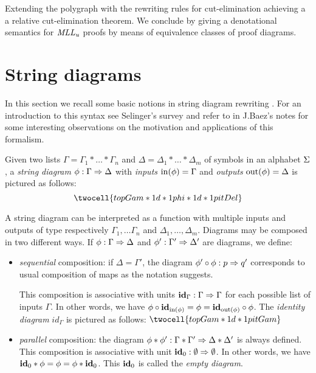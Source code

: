 \documentclass[a4paper]{article}
\begin{document}
Extending the polygraph with the rewriting rules for cut-elimination achieving a a relative cut-elimination theorem. We conclude by giving a denotational semantics  \cite{girard1991new} for $\mathit{MLL_u}$ proofs by means of equivalence classes of proof diagrams.


\section{String diagrams}

In this section we recall some basic notions in string diagram rewriting \cite{string}. For an introduction to this syntax see Selinger's survey \cite{Sel} and refer to  in  J.Baez's notes \cite{baez} for some  interesting observations on the motivation and applications of this formalism.

Given two lists $\Gamma=\Gamma_1 * \dots * \Gamma_n$ and $\Delta=\Delta_1 * \dots * \Delta_m$ of symbols in an alphabet $\Sigma$, a \emph{string diagram} $\phi : \Gamma \Rightarrow \Delta$ with \emph{inputs} $\mathrm{in}(\phi)=\Gamma$ and \emph{outputs} $\mathrm{out}(\phi)=\Delta$ is pictured as follows:
\vspace{-.3cm}
$$
\twocell{topGam *1 d *1 phi *1 d *1 pitDel}
$$

A string diagram can be interpreted as a function with multiple inputs and outputs  of type  respectively $\Gamma_1, \dots \Gamma_n$ and $\Delta_1 , \dots , \Delta_m$. 
Diagrams may be composed in two different ways. If $\phi : \Gamma \Rightarrow \Delta$ and $\phi': \Gamma' \Rightarrow \Delta'$ are diagrams, we define:
\begin{itemize}

\item \emph{sequential} composition: if $\Delta=\Gamma'$, the diagram $\phi' \circ \phi : p\Rightarrow q'$ corresponds to usual composition of maps as the notation suggests.

This composition is associative with units $\textbf{id}_\Gamma: \Gamma \Rightarrow \Gamma$ for each possible list of inputs $\Gamma$. In other words, we have $\phi \circ \textbf{id}_{\mathrm{in} (\phi)}= \phi= \textbf{id}_{\mathrm{out} (\phi)} \circ \phi$. The\emph{ identity diagram} $id_\Gamma$ is pictured as follows: $\twocell{topGam *1 d *1 pitGam }$


\item \emph{parallel}  composition: the diagram $\phi * \phi': \Gamma * \Gamma' \Rightarrow \Delta * \Delta'$ is always defined.
This composition is associative with unit $\textbf{id}_0: \emptyset \Rightarrow \emptyset$. In other words, we have $\textbf{id}_0 * \phi=\phi=\phi * \textbf{id}_0$. This $\textbf{id}_0$ is called the \emph{empty diagram}.
\end{itemize}
\end{document}
